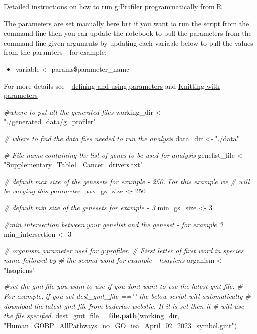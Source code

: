 \documentclass[
]{book}
\newenvironment{Shaded}{\begin{snugshade}}{\end{snugshade}}
\newcommand{\CommentTok}[1]{\textcolor[rgb]{0.56,0.35,0.01}{\textit{#1}}}
\newcommand{\DecValTok}[1]{\textcolor[rgb]{0.00,0.00,0.81}{#1}}
\newcommand{\FunctionTok}[1]{\textcolor[rgb]{0.13,0.29,0.53}{\textbf{#1}}}
\newcommand{\NormalTok}[1]{#1}
\newcommand{\OtherTok}[1]{\textcolor[rgb]{0.56,0.35,0.01}{#1}}
\newcommand{\StringTok}[1]{\textcolor[rgb]{0.31,0.60,0.02}{#1}}
\providecommand{\tightlist}{%
  \setlength{\itemsep}{0pt}\setlength{\parskip}{0pt}}
\begin{document}
Detailed instructions on how to run \href{https://biit.cs.ut.ee/gprofiler/gost}{g:Profiler} programmatically from R

The parameters are set manually here but if you want to run the script from the command line then you can update the notebook to pull the parameters from the command line given arguments by updating each variable below to pull the values from the paramters - for example:

\begin{itemize}
\tightlist
\item
  variable \textless- params\$parameter\_name
\end{itemize}

For more details see - \href{https://bookdown.org/yihui/rmarkdown/params-declare.html}{defining and using parameters} and \href{https://bookdown.org/yihui/rmarkdown/params-knit.html}{Knitting with parameters}

\begin{Shaded}
\begin{Highlighting}[]
\CommentTok{\#where to put all the generated files}
\NormalTok{working\_dir }\OtherTok{\textless{}{-}} \StringTok{"./generated\_data/g\_profiler"}

\CommentTok{\# where to find the data files needed to run the analysis}
\NormalTok{data\_dir }\OtherTok{\textless{}{-}}  \StringTok{"./data"}

\CommentTok{\# File name containing the list of genes to be used for analysis}
\NormalTok{genelist\_file }\OtherTok{\textless{}{-}} \StringTok{"Supplementary\_Table1\_Cancer\_drivers.txt"}

\CommentTok{\# default max size of the genesets for example {-}  250.  For this example we}
\CommentTok{\# will be varying this parameter}
\NormalTok{max\_gs\_size }\OtherTok{\textless{}{-}} \DecValTok{250}

\CommentTok{\# default min size of the genesets for example {-}  3}
\NormalTok{min\_gs\_size }\OtherTok{\textless{}{-}} \DecValTok{3}

\CommentTok{\#min intersection between your genelist and the geneset {-} for example 3}
\NormalTok{min\_intersection }\OtherTok{\textless{}{-}} \DecValTok{3}

\CommentTok{\# organism parameter used for g:profiler.  }
\CommentTok{\# First letter of first word in species name followed by }
\CommentTok{\# the second word for example {-} hsapiens}
\NormalTok{organism }\OtherTok{\textless{}{-}} \StringTok{"hsapiens"}

\CommentTok{\#set the gmt file you want to use if you don\textquotesingle{}t want to use the latest gmt file.}
\CommentTok{\# For example, if you set dest\_gmt\_file =="" the below script will automatically}
\CommentTok{\# download the latest gmt file from baderlab webstie.  If it is set then it}
\CommentTok{\# will use the file specified.  }
\NormalTok{dest\_gmt\_file }\OtherTok{=} \FunctionTok{file.path}\NormalTok{(working\_dir, }
                  \StringTok{"Human\_GOBP\_AllPathways\_no\_GO\_iea\_April\_02\_2023\_symbol.gmt"}\NormalTok{)}
\end{Highlighting}
\end{Shaded}
\end{document}
